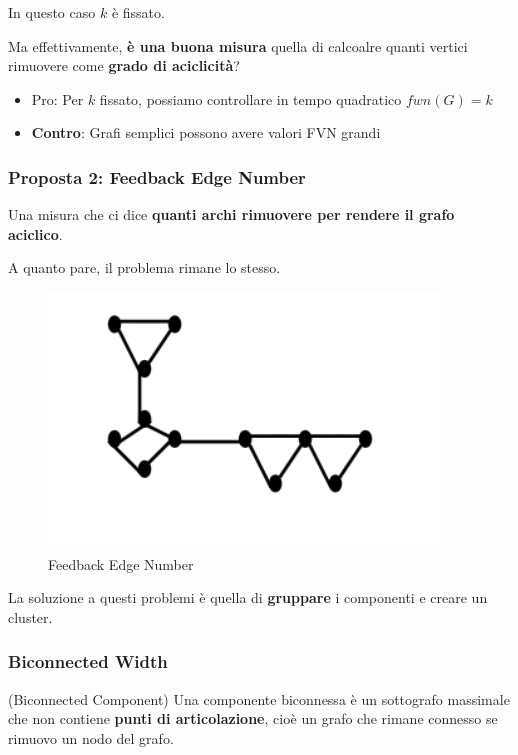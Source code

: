 In questo caso $k$ è fissato.

Ma effettivamente, \textbf{è una buona misura} quella di calcoalre quanti
vertici rimuovere come \textbf{grado di aciclicità}?

\begin{itemize}
    \item Pro: Per $k$ fissato, possiamo controllare in tempo quadratico $fwn(G) = k$
    \item \textbf{Contro}: Grafi semplici possono avere valori FVN grandi
\end{itemize}

\subsubsection{Proposta 2: Feedback Edge Number}
Una misura che ci dice \textbf{quanti archi rimuovere per rendere il grafo
    aciclico}.

A quanto pare, il problema rimane lo stesso.

\begin{figure}[H]
    \centering
    \includegraphics[width=0.7\linewidth]{chapters/images/feg.png}
    \caption{Feedback Edge Number}
    \label{fig:3}
\end{figure}

La soluzione a questi problemi è quella di \textbf{gruppare} i componenti e
creare un cluster.

\subsubsection{Biconnected Width}

\begin{definition}(Biconnected Component)
    Una componente biconnessa è un sottografo massimale che non contiene \textbf{punti di articolazione}, cioè
    un grafo che rimane connesso se rimuovo un nodo del grafo.
\end{definition}

